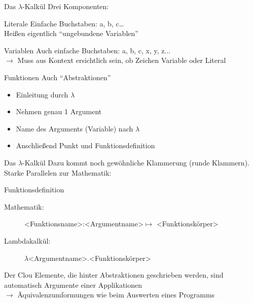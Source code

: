 \documentclass[18pt]{beamer}
\begin{document}
	\begin{frame}{Das $\lambda$-Kalkül}
		Drei Komponenten:
		\pause
		\begin{block}{Literale}
			Einfache Buchstaben: a, b, c\dots \\
			Heißen eigentlich "`ungebundene Variablen"'
		\end{block}
		\pause
		\begin{block}{Variablen}
			Auch einfache Buchstaben: a, b, c, x, y, z...\\
			$\rightarrow$ Muss aus Kontext ersichtlich sein, ob Zeichen Variable oder Literal
		\end{block}
		\pause
		\begin{block}{Funktionen}
			Auch "`Abstraktionen"'
			\begin{itemize}
				\item Einleitung durch $\lambda$
				\item Nehmen genau 1 Argument
				\item Name des Arguments (Variable) nach $\lambda$
				\item Anschließend Punkt und Funktionsdefinition
			\end{itemize}
		\end{block}
	\end{frame}

	\begin{frame}{Das $\lambda$-Kalkül}
		Dazu kommt noch gewöhnliche Klammerung (runde Klammern).\\
		Starke Parallelen zur Mathematik:
		\begin{exampleblock}{Funktionsdefinition}
			\begin{description}
				\item[Mathematik:] \textless Funktionsname\textgreater:\textless Argumentname\textgreater $\mapsto$ \textless Funktionskörper\textgreater
				\item[Lambdakalkül:] $\lambda$\textless Argumentname\textgreater.\textless Funktionskörper\textgreater
			\end{description}
		\end{exampleblock}
		\pause
		\begin{alertblock}{Der Clou}
			Elemente, die hinter Abstraktionen geschrieben werden, sind automatisch Argumente einer Applikationen \\
			$\rightarrow $ Äquivalenzumformungen wie beim Auswerten eines Programms
		 \end{alertblock}
	\end{frame}
\end{document}
